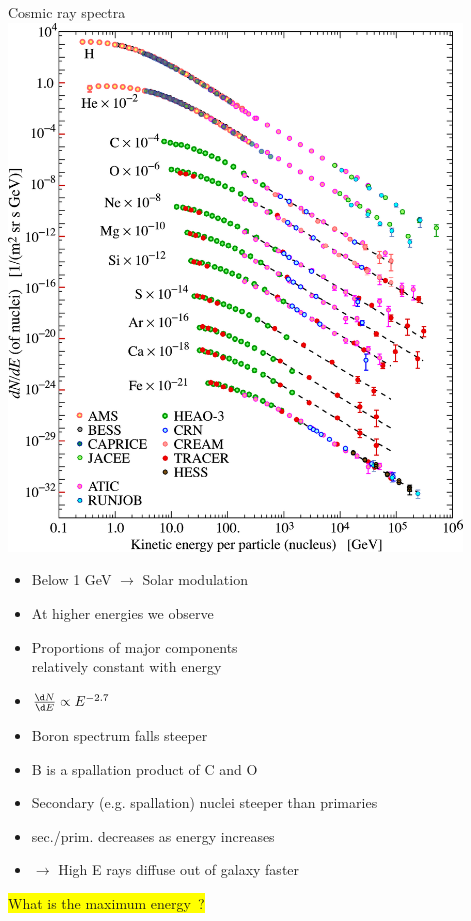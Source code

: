 \Tr
\begin{center}
{\blue Cosmic ray spectra}\\[5mm]
\includegraphics[keepaspectratio,height=14cm]{cr-low-e}
\end{center}

\newpage

\vspace*{1mm}
\begin{itemize}
\item[] Below 1 GeV $\rightarrow$ Solar modulation
\item[] At higher energies we observe
\item Proportions of major components\\
      relatively constant with energy
\item $\frac{\d N}{\d E} \propto E^{-2.7}$
\item Boron spectrum falls steeper
\item[] B is a spallation product of C and O
\item[] Secondary (e.g. spallation) nuclei steeper than primaries
\item sec./prim. decreases as energy increases
\item[] $\rightarrow$ High E rays diffuse out of galaxy faster
\end{itemize}
%
\colorbox{yellow}{What is the maximum energy~?}

